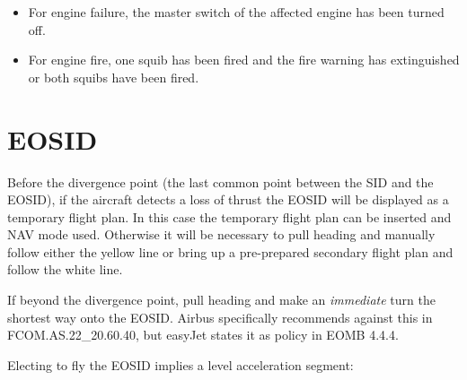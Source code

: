 \documentclass[a5paper,11pt,twoside]{book}
\newcommand{\multicite}[1]{
  \nopagebreak
  \noindent{\footnotesize\color{blue}{[ #1 ]}}
}
\begin{document}
\begin{itemize}
\item For engine failure, the master switch of the affected engine has been
  turned off.

\item For engine fire, one squib has been fired and the fire warning has
  extinguished or both squibs have been fired.
\end{itemize}

\multicite{FCTM PRO.AEP.ENG}




\section{EOSID}

Before the divergence point (the last common point between the SID and the
EOSID), if the aircraft detects a loss of thrust the EOSID will be displayed as
a temporary flight plan. In this case the temporary flight plan can be inserted
and NAV mode used. Otherwise it will be necessary to pull heading and manually
follow either the yellow line or bring up a pre-prepared secondary flight plan
and follow the white line.

If beyond the divergence point, pull heading and make an \emph{immediate} turn
the shortest way onto the EOSID. Airbus specifically recommends against this in
FCOM.AS.22\_20.60.40, but easyJet states it as policy in EOMB 4.4.4.

Electing to fly the EOSID implies a level acceleration segment:
\end{document}
